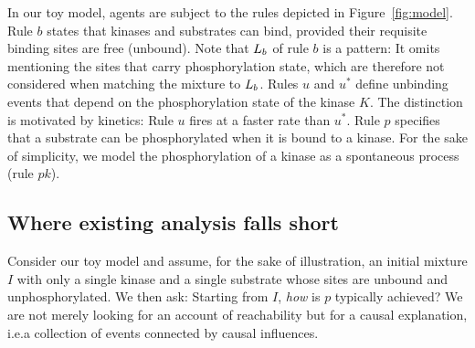 \longversion{}

In our toy model, agents are subject to the rules depicted in Figure~\ref{fig:model}. Rule $b$ states that kinases and substrates can bind, provided their requisite binding sites are free (unbound). Note that $L_{b}$ of rule $b$ is a pattern: It omits mentioning the sites that carry phosphorylation state, which are therefore not considered when matching the mixture to $L_{b}$. Rules $u$ and $u^{*}$ define unbinding events that depend
on the phosphorylation state of the kinase $K$. The distinction is motivated by
kinetics: Rule $u$ fires at a faster rate than $u^{*}$. Rule $p$ specifies that
a substrate can be phosphorylated when it is bound to a kinase. For the sake of
simplicity, we model the phosphorylation of a kinase as a spontaneous process (rule $pk$).

\subsection{Where existing analysis falls short}
\label{subsec:dumb-story}


Consider our toy model and assume, for the
sake of illustration, an initial mixture $I$ with only a single kinase
and a single substrate whose sites are unbound and
unphosphorylated. We then ask: Starting from $I$, \emph{how} is $p$ typically achieved? We are not merely looking for an account of
reachability but for a causal explanation, i.e.\@ a collection of events connected by causal influences.

